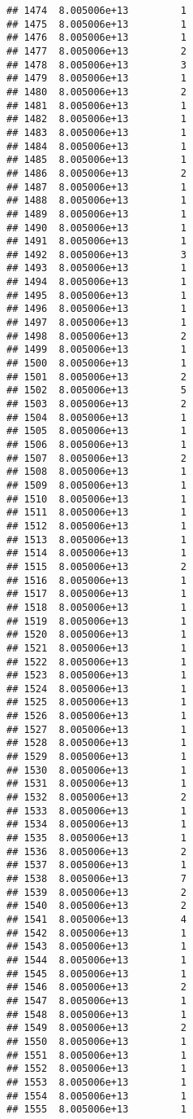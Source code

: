 \documentclass[
]{article}
\begin{document}
\begin{verbatim}
## 1474  8.005006e+13         1
## 1475  8.005006e+13         1
## 1476  8.005006e+13         1
## 1477  8.005006e+13         2
## 1478  8.005006e+13         3
## 1479  8.005006e+13         1
## 1480  8.005006e+13         2
## 1481  8.005006e+13         1
## 1482  8.005006e+13         1
## 1483  8.005006e+13         1
## 1484  8.005006e+13         1
## 1485  8.005006e+13         1
## 1486  8.005006e+13         2
## 1487  8.005006e+13         1
## 1488  8.005006e+13         1
## 1489  8.005006e+13         1
## 1490  8.005006e+13         1
## 1491  8.005006e+13         1
## 1492  8.005006e+13         3
## 1493  8.005006e+13         1
## 1494  8.005006e+13         1
## 1495  8.005006e+13         1
## 1496  8.005006e+13         1
## 1497  8.005006e+13         1
## 1498  8.005006e+13         2
## 1499  8.005006e+13         1
## 1500  8.005006e+13         1
## 1501  8.005006e+13         2
## 1502  8.005006e+13         5
## 1503  8.005006e+13         2
## 1504  8.005006e+13         1
## 1505  8.005006e+13         1
## 1506  8.005006e+13         1
## 1507  8.005006e+13         2
## 1508  8.005006e+13         1
## 1509  8.005006e+13         1
## 1510  8.005006e+13         1
## 1511  8.005006e+13         1
## 1512  8.005006e+13         1
## 1513  8.005006e+13         1
## 1514  8.005006e+13         1
## 1515  8.005006e+13         2
## 1516  8.005006e+13         1
## 1517  8.005006e+13         1
## 1518  8.005006e+13         1
## 1519  8.005006e+13         1
## 1520  8.005006e+13         1
## 1521  8.005006e+13         1
## 1522  8.005006e+13         1
## 1523  8.005006e+13         1
## 1524  8.005006e+13         1
## 1525  8.005006e+13         1
## 1526  8.005006e+13         1
## 1527  8.005006e+13         1
## 1528  8.005006e+13         1
## 1529  8.005006e+13         1
## 1530  8.005006e+13         1
## 1531  8.005006e+13         1
## 1532  8.005006e+13         2
## 1533  8.005006e+13         1
## 1534  8.005006e+13         1
## 1535  8.005006e+13         1
## 1536  8.005006e+13         2
## 1537  8.005006e+13         1
## 1538  8.005006e+13         7
## 1539  8.005006e+13         2
## 1540  8.005006e+13         2
## 1541  8.005006e+13         4
## 1542  8.005006e+13         1
## 1543  8.005006e+13         1
## 1544  8.005006e+13         1
## 1545  8.005006e+13         1
## 1546  8.005006e+13         2
## 1547  8.005006e+13         1
## 1548  8.005006e+13         1
## 1549  8.005006e+13         2
## 1550  8.005006e+13         1
## 1551  8.005006e+13         1
## 1552  8.005006e+13         1
## 1553  8.005006e+13         1
## 1554  8.005006e+13         1
## 1555  8.005006e+13         1

\end{verbatim}
\end{document}
